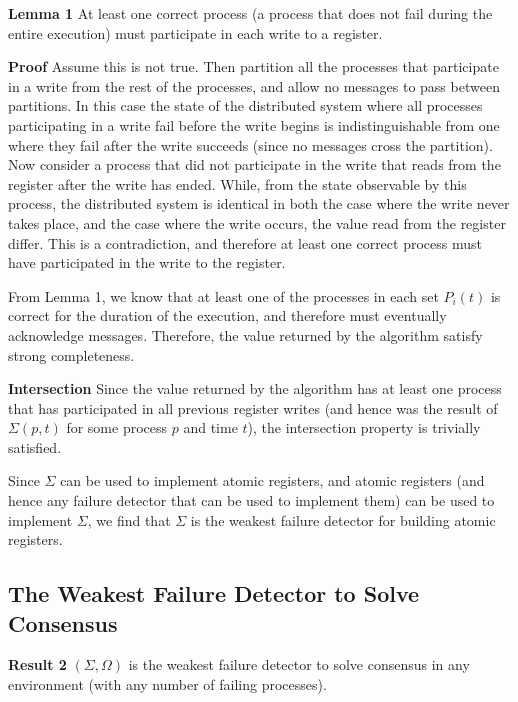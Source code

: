 \textbf{Lemma 1} At least one correct process (\ie a process that does not fail during the entire execution) must
participate in each write to a register.

\textbf{Proof} Assume this is not true. Then partition all the processes that participate in a write from the rest of
the processes, and allow no messages to pass between partitions. In this case the state of the distributed system where
all processes participating in a write fail before the write begins is indistinguishable from one where they fail after
the write succeeds (since no messages cross the partition). Now consider a process that did not participate in the write
that reads from the register after the write has ended. While, from the state observable by this process,  the distributed 
system is identical in both the case where the write never takes place, and the case where the write occurs, the value
read from the register differ. This is a contradiction, and therefore at least one correct process must have
participated in the write to the register.

From Lemma 1, we know that at least one of the processes in each set $P_i(t)$ is correct for the duration of the
execution, and therefore must eventually acknowledge messages. Therefore, the value returned by the algorithm satisfy
strong completeness.

\textbf{Intersection} Since the value returned by the algorithm has at least one process that has participated in all
previous register writes (and hence was the result of $\Sigma(p, t)$ for some process $p$ and time $t$), the
intersection property is trivially satisfied.

Since $\Sigma$ can be used to implement atomic registers, and atomic registers (and hence any failure detector that can
be used to implement them) can be used to implement $\Sigma$, we find that $\Sigma$ is the weakest failure detector for
building atomic registers.

\subsection{The Weakest Failure Detector to Solve Consensus} 
\textbf{Result 2} $(\Sigma, \Omega)$ is the weakest failure detector to solve consensus in any environment (\ie with any
number of failing processes).

